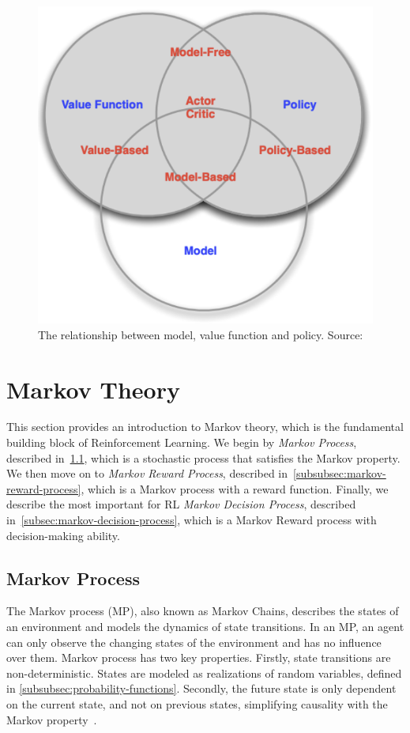 \documentclass[../xlapes02]{subfiles}
\begin{document}
    \begin{figure}[h]
        \includegraphics[width=0.5\linewidth]{image/model-value-policy}
        \centering
        \caption{The relationship between model, value function and policy. Source:~\cite{FITMT25127}}
        \label{fig:model-value-policy-introduction}
    \end{figure}


    \section{Markov Theory}\label{sec:markov-theory}
    This section provides an introduction to Markov theory, which is the fundamental building block of Reinforcement Learning. We begin by \emph{Markov Process}, described in~\cref{subsec:markov-process}, which is a stochastic process that satisfies the Markov property. We then move on to \emph{Markov Reward Process}, described in~\cref{subsubsec:markov-reward-process}, which is a Markov process with a reward function. Finally, we describe the most important for RL \emph{Markov Decision Process}, described in~\cref{subsec:markov-decision-process}, which is a Markov Reward process with decision-making ability.

    \subsection{Markov Process}\label{subsec:markov-process}
    The Markov process (MP), also known as Markov Chains, describes the states of an environment and models the dynamics of state transitions. In an MP, an agent can only observe the changing states of the environment and has no influence over them. Markov process has two key properties. Firstly, state transitions are non-deterministic. States are modeled as realizations of random variables, defined in \cref{subsubsec:probability-functions}. Secondly, the future state is only dependent on the current state, and not on previous states, simplifying causality with the Markov property~\cite{rao2022foundations, inproceedings}.
\end{document}
